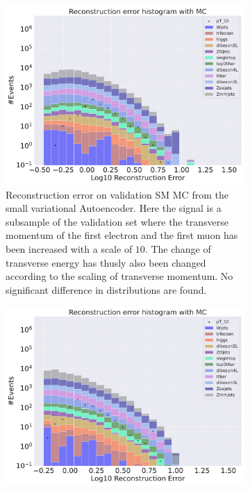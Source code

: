 \begin{figure}[h!]
    \centering
    \begin{subfigure}{.45\textwidth}
        \includegraphics[width=\textwidth]{Figures/VAE_testing/small/b_data_recon_big_rm3_feats_sig_pT_10.pdf}
        \caption{Reconstruction error on validation SM MC from the small variational Autoencoder. Here the signal is a subsample of the validation 
        set where the transverse momentum of the first electron and the first muon has been increased with a scale of $10$. The change of transverse 
        energy has thusly also been changed according to the scaling of transverse momentum. No significant difference in distributions are found. }
        \label{fig:VAE_small_pt_10}
    \end{subfigure}
    \hfill 
    \begin{subfigure}{.45\textwidth}
        \includegraphics[width=\textwidth]{Figures/VAE_testing/big/b_data_recon_big_rm3_feats_sig_pT_10.pdf}

\end{subfigure}
\end{figure}
